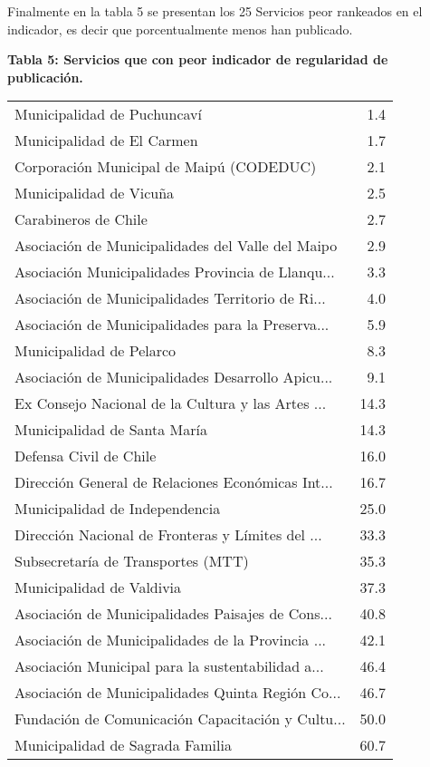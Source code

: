 \documentclass[11pt]{article}
\begin{document}
    Finalmente en la tabla 5 se presentan los 25 Servicios peor rankeados en
el indicador, es decir que porcentualmente menos han publicado.

\textbf{Tabla 5: Servicios que con peor indicador de regularidad de
publicación.}

    \begin{tabular}{lr}
\toprule
                       Municipalidad de Puchuncaví &   1.4 \\
                        Municipalidad de El Carmen &   1.7 \\
          Corporación Municipal de Maipú (CODEDUC) &   2.1 \\
                           Municipalidad de Vicuña &   2.5 \\
                              Carabineros de Chile &   2.7 \\
 Asociación de Municipalidades del Valle del Maipo &   2.9 \\
 Asociación Municipalidades Provincia de Llanqu... &   3.3 \\
 Asociación de Municipalidades Territorio de Ri... &   4.0 \\
 Asociación de Municipalidades para la Preserva... &   5.9 \\
                          Municipalidad de Pelarco &   8.3 \\
 Asociación de Municipalidades Desarrollo Apicu... &   9.1 \\
 Ex Consejo Nacional de la Cultura y las Artes ... &  14.3 \\
                      Municipalidad de Santa María &  14.3 \\
                            Defensa Civil de Chile &  16.0 \\
 Dirección General de Relaciones Económicas Int... &  16.7 \\
                    Municipalidad de Independencia &  25.0 \\
 Dirección Nacional de Fronteras y Límites del ... &  33.3 \\
                Subsecretaría de Transportes (MTT) &  35.3 \\
                         Municipalidad de Valdivia &  37.3 \\
 Asociación de Municipalidades Paisajes de Cons... &  40.8 \\
 Asociación de Municipalidades de la Provincia ... &  42.1 \\
 Asociación Municipal para la sustentabilidad a... &  46.4 \\
 Asociación de Municipalidades Quinta Región Co... &  46.7 \\
 Fundación de Comunicación Capacitación y Cultu... &  50.0 \\
                  Municipalidad de Sagrada Familia &  60.7 \\
\bottomrule
\end{tabular}
\end{document}
